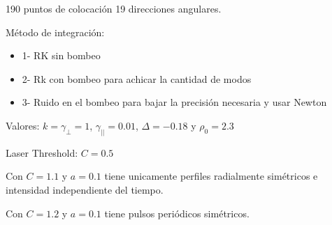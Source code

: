 	190 puntos de colocación 19 direcciones angulares.
	
	Método de integración:
	\begin{itemize}
		\item 1- RK sin bombeo
		\item 2- Rk con bombeo para achicar la cantidad de modos
		\item 3- Ruido en el bombeo para bajar la precisión necesaria y usar Newton
	\end{itemize}
	
	Valores:
	$k=\gamma_{\bot}=1$, $\gamma_{||}=0.01$, $\Delta=-0.18$ y $\rho_0=2.3$
	
	Laser Threshold: $C=0.5$
	
	Con $C=1.1$ y $a=0.1$ tiene unicamente perfiles radialmente simétricos e intensidad independiente del tiempo.
	
	Con  $C=1.2$ y $a=0.1$ tiene pulsos periódicos simétricos.